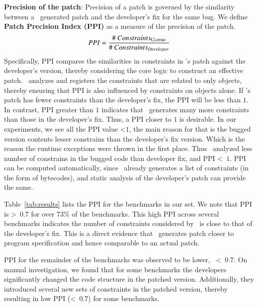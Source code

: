\begin{mylist}
\item \textbf{Precision of the patch}: Precision of a patch is governed by the
similarity between a \tool\ generated patch and the developer's fix for the same
bug. We define \textbf{Patch Precision Index (PPI)} as a measure of the
precision of the patch. $$PPI =
\frac{\#~Constraints_{\textsc{Clotho}}}{\#~Constraints_{Developer}}$$
% 
Specifically, PPI compares the similarities in constraints in \tool's patch
against the developer's version, thereby considering the core logic to construct
an effective patch. \tool\ analyzes and registers the constraints that are
related to only  objects, thereby ensuring that PPI is also
influenced by constraints on  objects alone. If \tool's patch has
fewer constraints than the developer's fix, the PPI will be less than $1$. In
contrast, PPI greater than $1$ indicates that \tool\ generates many more
constraints than those in the developer's fix. Thus, a PPI closer to $1$ is
desirable. In our experiments, we see all the PPI value \textless $1$, the main
reason for that is the bugged version contents lesser constrains than the
developer's fix version. Which is the reason the runtime exceptions were
thrown in the first place. Thus \tool\ analyzed less number of constrains in
the bugged code than developer fix, and PPI \textless\ $1$. PPI can be computed
automatically, since \tool\ already generates a list of constraints (in the form
of bytecodes), and static analysis of the developer's patch can provide the same.

Table~\ref{tab:results} lists the PPI for the benchmarks in our set. We note
that PPI is \textgreater\ $0.7$ for over $73\%$ of the benchmarks. This high PPI
across several benchmarks indicates the number of  constraints
considered by \tool\ is close to that of the developer's fix. This is a direct
evidence that \tool\ generates patch closer to program specification and hence
comparable to an actual patch. PPI for the remainder
of the benchmarks was observed to be lower, \ie\ \textless\ $0.7$. On manual
investigation, we found that for some benchmarks the developers significantly
changed the code structure in the patched version. Additionally, they introduced
several new sets of constraints in the patched version, thereby resulting in
low PPI (\textless\ $0.7$) for some benchmarks.


\end{mylist}
